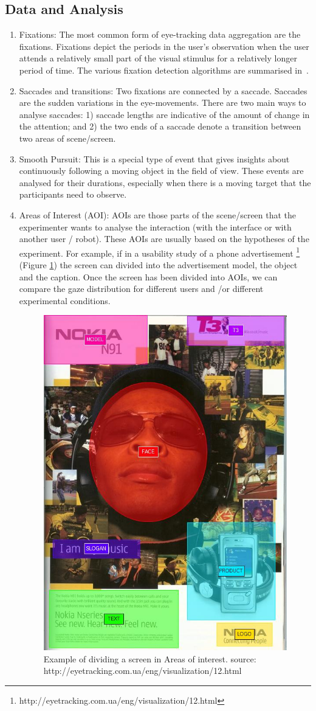 \documentclass{sig-alternate}
\begin{document}
\subsection{Data and Analysis}

\begin{enumerate}
\item Fixations: The most common form of eye-tracking data aggregation are the fixations. Fixations depict the periods in the user's observation when the user attends a relatively small part of the visual stimulus for a relatively longer period of time. The various fixation detection algorithms are summarised in~\cite{duchowski2007eye}. 

\item Saccades and transitions: Two fixations are connected by a saccade. Saccades are the sudden variations in the eye-movements. There are two main ways to analyse saccades: 1) saccade lengths are indicative of the amount of change in the attention; and 2) the two ends of a saccade denote a transition between two areas of scene/screen.

\item Smooth Pursuit: This is a special type of event that gives insights about continuously following a moving object in the field of view. These events are analysed for their durations, especially when there is a moving target that the participants need to observe.

\item Areas of Interest (AOI):  AOIs are those parts of the scene/screen that the experimenter wants to analyse the interaction (with the interface or with another user / robot). These AOIs are usually based on the hypotheses of the experiment. For example, if in a usability study of a phone advertisement \footnote{http://eyetracking.com.ua/eng/visualization/12.html} (Figure \ref{aoi}) the screen can divided into the advertisement model, the object and the caption. Once the screen has been divided into AOIs, we can compare the gaze distribution for different users and /or different experimental conditions.

\begin{figure}
    \centering
    \includegraphics[width=0.4\linewidth]{nokia.jpg}
    \caption{Example of dividing a screen in Areas of interest.
    source: http://eyetracking.com.ua/eng/visualization/12.html}
    \label{aoi}
\end{figure}



\end{enumerate}
\end{document}
